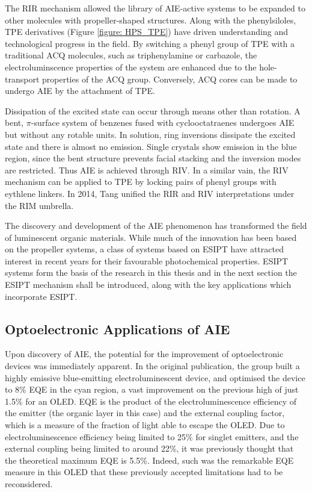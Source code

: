 The \ac{RIR} mechanism allowed the library of \ac{AIE}-active systems to be expanded to other molecules with propeller-shaped structures. Along with the phenylsiloles, \ac{TPE} derivatives (Figure \ref{figure: HPS_TPE}) have driven understanding and technological progress in the field.\cite{Hong2009,Wang2010a,Hong2011,Mei2014,Hu2014,Mei2015} By switching a phenyl group of \ac{TPE} with a traditional \ac{ACQ} molecules, such as triphenylamine or carbazole, the electroluminscence properties of the system are enhanced due to the hole-transport properties of the \ac{ACQ} group.\cite{Chan2014} Conversely, \ac{ACQ} cores can be made to undergo \ac{AIE} by the attachment of \ac{TPE}.\cite{Yuan2010a}

Dissipation of the excited state can occur through means other than rotation. A bent, $\pi$-surface system of benzenes fused with cyclooctatraenes undergoes \ac{AIE} but without any rotable units.\cite{Nishiuchi2013} In solution, ring inversions dissipate the excited state and there is almost no emission. Single crystals show emission in the blue region, since the bent structure prevents facial stacking and the inversion modes are restricted. Thus \ac{AIE} is achieved through \ac{RIV}. In a similar vain, the \ac{RIV} mechanism can be applied to \ac{TPE} by locking pairs of phenyl groups with eythlene linkers. In 2014, Tang unified the \ac{RIR} and \ac{RIV} interpretations under the \ac{RIM} umbrella.\cite{Leung2014}

The discovery and development of the \ac{AIE} phenomenon has transformed the field of luminescent organic materials. While much of the innovation has been based on the propeller systems, a class of systems based on \ac{ESIPT} have attracted interest in recent years for their favourable photochemical properties. \ac{ESIPT} systems form the basis of the research in this thesis and in the next section the \ac{ESIPT} mechanism shall be introduced, along with the key applications which incorporate \ac{ESIPT}.

\subsection{Optoelectronic Applications of AIE}\label{section: lom AIE_applications}
Upon discovery of \ac{AIE}, the potential for the improvement of optoelectronic devices was immediately apparent. In the original publication, the group built a highly emissive blue-emitting electroluminescent device, and optimised the device to 8\% \ac{EQE} in the cyan region, a vast improvement on the previous high of just 1.5\% for an \ac{OLED}. \cite{Luo2001,Chen2002} \ac{EQE} is the product of the electroluminescence efficiency of the emitter (the organic layer in this case) and the external coupling factor, which is a measure of the fraction of light able to escape the \ac{OLED}. Due to electroluminescence efficiency being limited to 25\% for singlet emitters, and the external coupling being limited to around 22\%, it was previously thought that the theoretical maximum \ac{EQE} is 5.5\%. Indeed, such was the remarkable \ac{EQE} measure in this \ac{OLED} that these previously accepted limitations had to be reconsidered.

